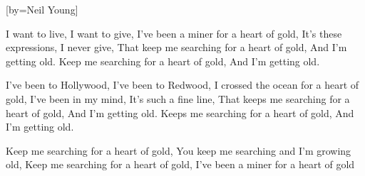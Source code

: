 

[by=Neil Young]

\begin{LARGE}


\beginverse
I want to live, I want to give,
I've been a miner for a heart of gold,
It's these expressions, I never give,
That keep me searching for a heart of gold, And I'm getting old.
Keep me searching for a heart of gold, And I'm getting old.
\endverse

\beginverse
I've been to Hollywood, I've been to Redwood,
I crossed the ocean for a heart of gold,
I've been in my mind, It's such a fine line,
That keeps me searching for a heart of gold, And I'm getting old.
Keeps me searching for a heart of gold, And I'm getting old.
\endverse

\beginverse
Keep me searching for a heart of gold,
You keep me searching and I'm growing old,
Keep me searching for a heart of gold,
I've been a miner for a heart of gold
\endverse

\end{LARGE}


\chordson
\endsong
